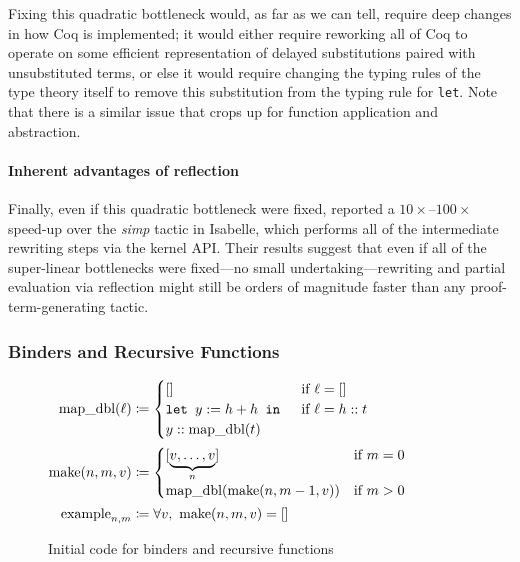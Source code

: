 Fixing this quadratic bottleneck would, as far as we can tell, require deep changes in how Coq is implemented; it would either require reworking all of Coq to operate on some efficient representation of delayed substitutions paired with unsubstituted terms, or else it would require changing the typing rules of the type theory itself to remove this substitution from the typing rule for \texttt{let}.
Note that there is a similar issue that crops up for function application and abstraction.

\paragraph{Inherent advantages of reflection}

Finally, even if this quadratic bottleneck were fixed, \textcite{Aehlig} reported a $10\times$--$100\times$ speed-up over the \emph{simp} tactic in Isabelle, which performs all of the intermediate rewriting steps via the kernel API.
Their results suggest that even if all of the super-linear bottlenecks were fixed---no small undertaking---rewriting and partial evaluation via reflection might still be orders of magnitude faster than any proof-term-generating tactic.

\subsubsection{Binders and Recursive Functions}\label{sec:micro:LiftLetsMap}

\begin{figure}
{\small %
$\begin{aligned}
  \text{map\_dbl}(\ell) & \defeq \begin{cases} [] & \text{if }\ell = [] \\
      \letin[{y := h + h}{}] & \text{if }\ell = h::t \\
      y :: \text{map\_dbl}(t) &
      \end{cases} \\
  \text{make}(n, m, v) & \defeq \begin{cases} [\underbrace{v, \ldots, v}_n] & \text{if }m = 0 \\
      \text{map\_dbl}(\text{make}(n, m-1, v)) & \text{if }m > 0
      \end{cases} \\
  \text{example}_{n, m} & \defeq \forall v,\ \text{make}(n, m, v) = []
\end{aligned}$}%
\caption{\label{fig:micro:LiftLetsMap:code}Initial code for binders and recursive functions}
\end{figure}

